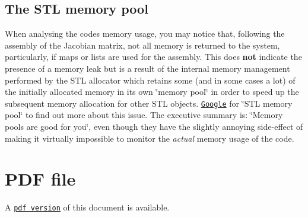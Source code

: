 \hypertarget{index_STL_pool}{}\subsection{The S\+T\+L memory pool}\label{index_STL_pool}
When analysing the code\textquotesingle{}s memory usage, you may notice that, following the assembly of the Jacobian matrix, not all memory is returned to the system, particularly, if maps or lists are used for the assembly. This does {\bfseries not} indicate the presence of a memory leak but is a result of the internal memory management performed by the S\+TL allocator which retains some (and in some cases a lot) of the initially allocated memory in its own \char`\"{}memory pool\char`\"{} in order to speed up the subsequent memory allocation for other S\+TL objects. \href{http://www.google.com}{\tt Google} for \char`\"{}\+S\+T\+L memory pool\char`\"{} to find out more about this issue. The executive summary is\+: \char`\"{}\+Memory pools are good for you\char`\"{}, even though they have the slightly annoying side-\/effect of making it virtually impossible to monitor the {\itshape actual} memory usage of the code.



 

 \hypertarget{index_pdf}{}\section{P\+D\+F file}\label{index_pdf}
A \href{../latex/refman.pdf}{\tt pdf version} of this document is available. 
